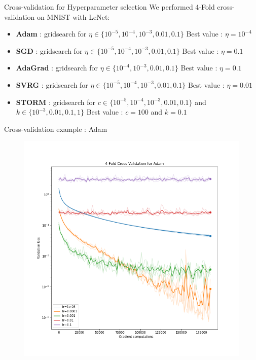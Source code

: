 \documentclass[10pt]{beamer}
\begin{document}
\begin{frame}{Cross-validation for Hyperparameter selection}
    We performed 4-Fold cross-validation on MNIST with LeNet:
    \begin{itemize}
        \item \textbf{Adam} : gridsearch for $\eta \in \{10^{-5}, 10^{-4}, 10^{-3}, 0.01, 0.1\}$ \newline
        Best value : $\eta = 10^{-4}$
        \item \textbf{SGD} : gridsearch for $\eta \in \{10^{-5}, 10^{-4}, 10^{-3}, 0.01, 0.1\}$ \newline
        Best value : $\eta = 0.1$
        \item \textbf{AdaGrad} : gridsearch for $\eta \in \{10^{-4}, 10^{-3}, 0.01, 0.1\}$ \newline
        Best value : $\eta = 0.1$
        \item \textbf{SVRG} : gridsearch for $\eta \in \{10^{-5}, 10^{-4}, 10^{-3}, 0.01, 0.1\}$ \newline
        Best value : $\eta = 0.01$
        \item \textbf{STORM} : gridsearch for $c \in \{10^{-5}, 10^{-4}, 10^{-3}, 0.01, 0.1\}$ and $k \in \{10^{-3}, 0.01, 0.1, 1\}$\newline
        Best value : $c = 100$ and $k=0.1$
        
    \end{itemize}
\end{frame}

\begin{frame}{Cross-validation example : Adam}
    \begin{figure}
        \centering
    \includegraphics[scale=0.32]{midterm presentation/images/adamCV.png}
        \label{fig:adamCV}
    \end{figure}   
\end{frame}
\end{document}

